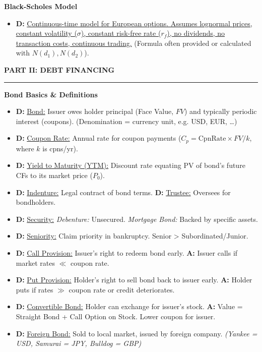 \documentclass[7pt,landscape]{extarticle} %
\newcommand{\cheatsheetsection}[1]{%
  \vspace{0.25ex plus 0.1ex minus 0.05ex}%
  \noindent\color{SecTitleColor}\textbf{\sffamily\small\MakeUppercase{#1}}%
  \par\vspace{0.02ex}%
  {\color{RuleColor}\hrule height 0.3pt}\par\vspace{0.15ex}%
}
\newcommand{\cheatsheetsubsubsection}[1]{%
  \vspace{0.15ex plus 0.05ex minus 0.05ex}%
  \noindent\textbf{\sffamily\scriptsize #1}%
  \par\vspace{0.05ex}%
}
\newcommand{\D}[1]{\textbf{\textcolor{DefColor}{D:}} \uline{#1}}
\newcommand{\A}[1]{\textbf{\textcolor{AppColor}{A:}} #1}
\newcommand{\SF}[1]{\textit{\small (#1)}} %
\begin{document}
\begin{multicols*}{4}
  \cheatsheetsubsubsection{Black-Scholes Model}
  \begin{itemize}
    \item \D{Continuous-time model for European options. Assumes lognormal prices, constant volatility ($\sigma$), constant risk-free rate ($r_f$), no dividends, no transaction costs, continuous trading.} (Formula often provided or calculated with $N(d_1), N(d_2)$).
  \end{itemize}

  \cheatsheetsection{Part II: Debt Financing}
  
  \cheatsheetsubsubsection{Bond Basics \& Definitions}
  \begin{itemize}
    \item \D{Bond:} Issuer owes holder principal (Face Value, $FV$) and typically periodic interest (coupons). (Denomination = currency unit, e.g. USD, EUR, \dots)
    \item \D{Coupon Rate:} Annual rate for coupon payments ($C_p = \text{CpnRate} \times FV / k$, where $k$ is cpns/yr).
    \item \D{Yield to Maturity (YTM):} Discount rate equating PV of bond's future CFs to its market price ($P_0$).
    \item \D{Indenture:} Legal contract of bond terms. \D{Trustee:} Oversees for bondholders.
    \item \D{Security:} \emph{Debenture:} Unsecured. \emph{Mortgage Bond:} Backed by specific assets.
    \item \D{Seniority:} Claim priority in bankruptcy. Senior > Subordinated/Junior.
    \item \D{Call Provision:} Issuer's right to redeem bond early. \A{Issuer calls if market rates $\ll$ coupon rate.}
    \item \D{Put Provision:} Holder's right to sell bond back to issuer early. \A{Holder puts if rates $\gg$ coupon rate or credit deteriorates.}
    \item \D{Convertible Bond:} Holder can exchange for issuer's stock. \A{Value = Straight Bond + Call Option on Stock. Lower coupon for issuer.}
    \item \D{Foreign Bond:} Sold to local market, issued by foreign company. \SF{Yankee = USD, Samurai = JPY, Bulldog = GBP}
  \end{itemize}
  

\end{multicols*}
\end{document}
